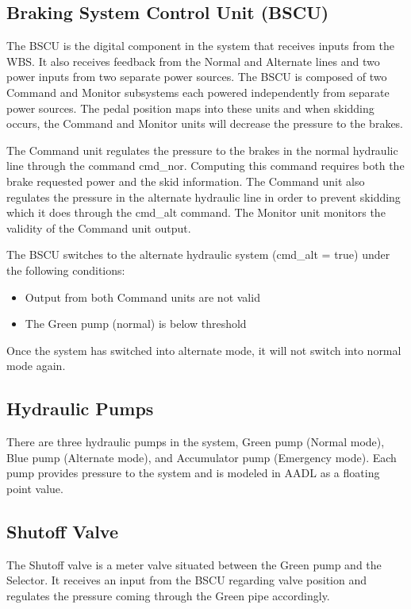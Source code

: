 \subsection{Braking System Control Unit (BSCU)}
The BSCU is the digital component in the system that receives inputs from the WBS. It also receives feedback from the Normal and Alternate lines and two power inputs from two separate power sources. The BSCU is composed of two Command and Monitor subsystems each powered independently from separate power sources. The pedal position maps into these units and when skidding occurs, the Command and Monitor units will decrease the pressure to the brakes. 

The Command unit regulates the pressure to the brakes in the normal hydraulic line through the command cmd_nor. Computing this command requires both the brake requested power and the skid information. The Command unit also regulates the pressure in the alternate hydraulic line in order to prevent skidding which it does through the cmd_alt command. The Monitor unit monitors the validity of the Command unit output. 

The BSCU switches to the alternate hydraulic system (cmd_alt = true) under the following conditions:
\begin{itemize}
\item Output from both Command units are not valid
\item The Green pump (normal) is below threshold
\end{itemize}

Once the system has switched into alternate mode, it will not switch into normal mode again. 

\subsection{Hydraulic Pumps}
There are three hydraulic pumps in the system, Green pump (Normal mode), Blue pump (Alternate mode), and Accumulator pump (Emergency mode). Each pump provides pressure to the system and is modeled in AADL as a floating point value. 

\subsection{Shutoff Valve}

The Shutoff valve is a meter valve situated between the Green pump and the Selector. It receives an input from the BSCU regarding valve position and regulates the pressure coming through the Green pipe accordingly.  

